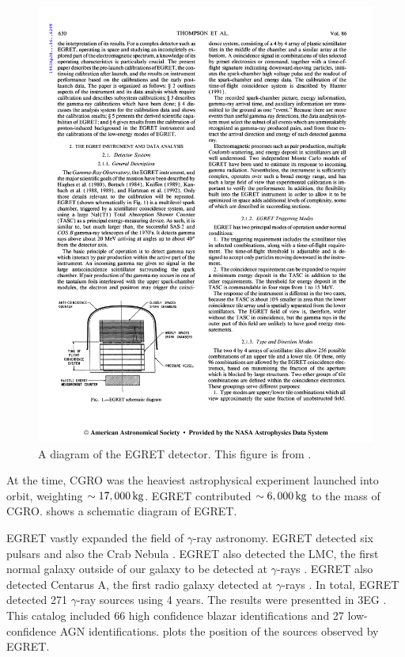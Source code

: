 \begin{figure}[htbp]
\centering
\includegraphics{chapters/introduction/figures/egret_detector.pdf}
\caption{A diagram of the \ac{EGRET} detector.
This figure is from \citep{thompson_1993a_calibration-energetic}.}
\end{figure}


At the time, \ac{CGRO} was the heaviest astrophysical experiment
launched into orbit, weighting $\sim17,000\,\text{kg}$. \ac{EGRET}
contributed $\sim6,000\,\text{kg}$ to the mass of \ac{CGRO}.
 shows a schematic diagram of \ac{EGRET}.

\ac{EGRET} vastly expanded the field of $\gamma$-ray astronomy.
\ac{EGRET} detected six pulsars \citep{nolan_1996a_egret-observations} and
also the Crab Nebula \cite{nolan_1993a_observations-pulsar}.  \ac{EGRET}
also detected the LMC, the first normal galaxy outside of our galaxy to
be detected at $\gamma$-rays \citep{sreekumar_1992a_observations-large}.
\ac{EGRET} also detected Centarus A, the first radio galaxy detected
at $\gamma$-rays \cite{sreekumar_1999a_emission-nearby}.  In total,
EGRET detected 271 $\gamma$-ray sources using 4 years.  The results were
presentted in \ac{3EG} \citep{hartman_1999a_third-egret}. This catalog
included 66 high confidence blazar identifications and 27 low-confidence
AGN identifications.  plots
the position of the sources observed by \ac{EGRET}.

